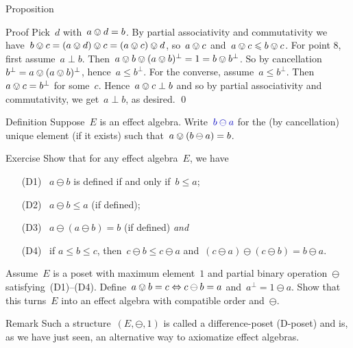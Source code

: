 \documentclass[b]{subfiles}
\begin{document}
\begin{parsec}
\begin{point}{Proposition}
\begin{point}{Proof}
Pick~$d$ with~$a \ovee d = b$.
By partial associativity and commutativity
    we have~$b \ovee c = (a \ovee d) \ovee c = (a \ovee c) \ovee d$,
    so~$a \ovee c$ and~$a \ovee c \leq b \ovee c$.
For point 8, first assume~$a \perp b$.
Then~$a \ovee b \ovee (a \ovee b)^\perp = 1 = b \ovee b^\perp$.
So by cancellation~$b^\perp = a \ovee (a \ovee b)^\perp$,
hence~$a \leq b^\perp$.
For the converse, assume~$a \leq b^\perp$.
Then~$a \ovee c = b^\perp$ for some~$c$.
Hence~$a \ovee c \perp b$
    and so  by partial associativity and commutativity,
        we get~$a \perp b$, as desired.
    \qed
\end{point}
\end{point}
\end{parsec}%

\begin{parsec}%
\begin{point}{Definition}%
Suppose~$E$ is an effect algebra.
Write~$\Define{b \ominus a}$
for the (by cancellation) unique element (if it exists)
such that~$a \ovee (b \ominus a) = b$.
\end{point}
\begin{point}{Exercise}%
Show that for any effect algebra~$E$, we have
\begin{enumerate}
    \item[(D1)]~$a \ominus b$ is defined if and only if~$b \leq a$;
    \item[(D2)]~$a \ominus b \leq a$ (if defined);
    \item[(D3)]~$a \ominus (a \ominus b) = b$ (if defined) \emph{and}
    \item[(D4)]~if $a \leq b \leq c $,
                then~$c \ominus b \leq c \ominus a$
                and~$(c \ominus a) \ominus (c \ominus b) = b \ominus a$.
\end{enumerate}
\begin{point}%
Assume~$E$ is a poset with maximum element~$1$
    and partial binary operation~$\ominus$
    satisfying~(D1)--(D4).
Define~$a \ovee b = c \Leftrightarrow c \ominus b = a$
    and~$a^\perp = 1 \ominus a$.
Show that this turns~$E$ into an effect algebra
    with compatible order and~$\ominus$.
\end{point}
\begin{point}{Remark}%
Such a structure~$(E,\ominus,1)$ is called a difference-poset
    (D-poset) and is, as we have just seen,
    an alternative way to axiomatize effect algebras.
\end{point}
\end{point}


\end{parsec}
\end{document}
